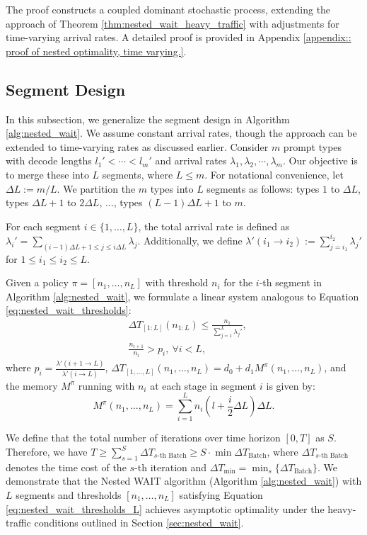 The proof constructs a coupled dominant stochastic process, extending the approach of Theorem \ref{thm:nested_wait_heavy_traffic} with adjustments for time-varying arrival rates. A detailed proof is provided in Appendix \ref{appendix:: proof of nested optimality, time varying.}.

\subsection{Segment Design}

In this subsection, we generalize the segment design in Algorithm \ref{alg:nested_wait}. We assume constant arrival rates, though the approach can be extended to time-varying rates as discussed earlier. Consider $m$ prompt types with decode lengths $l_1' < \cdots < l_m'$ and arrival rates $\lambda_1, \lambda_2, \cdots, \lambda_m$. Our objective is to merge these into $L$ segments, where $L \leq m$. For notational convenience, let $\Delta L:= m/L$. We partition the $m$ types into $L$ segments as follows: types $1$ to $\Delta L$, types $\Delta L+ 1$ to $2\Delta L$, $\dots$, types $(L-1)\Delta L+ 1$ to $m$.

For each segment $i \in \{1, \dots, L\}$, the total arrival rate is defined as $\lambda_i' = \sum_{(i-1)\Delta L+1\le j\le i\Delta L} \lambda_j$. Additionally, we define $\lambda'(i_1 \to i_2) := \sum_{j=i_1}^{i_2} \lambda_j'$ for $1 \leq i_1 \leq i_2 \leq L$.

Given a policy $\pi=[n_1,\dots,n_L]$ with threshold $n_i$ for the $i$-th segment in Algorithm \ref{alg:nested_wait}, we formulate a linear system analogous to Equation \eqref{eq:nested_wait_thresholds}:
\begin{equation}          \label{eq:nested_wait_thresholds_L}
    \begin{aligned}
    &\Delta T_{[1:L]}(n_{1:L}) \leq \frac{n_1}{\sum_{j=1}^L \lambda_j'},  \\
    &\frac{n_{i+1}}{n_i} > p_i, \ \forall i < L,
    \end{aligned}
\end{equation}
where $p_i =\frac{\lambda'(i+1 \to L)}{\lambda'(i \to L)}$, $\Delta T_{[1,\dots,L]}(n_1,\dots,n_L) = d_0 + d_1 M^\pi(n_1, \dots, n_L)$, and the  memory $M^\pi$ running with $n_i$ at each stage in segment $i$ is given by:
\[
M^{\pi}(n_1, \dots, n_L) = \sum_{i=1}^L n_i \left( l + \frac{i}{2} \Delta L\right) \Delta L.
\]

 We define that the total number of iterations over time horizon $[0,T]$ as $ S$. Therefore, we have $T\ge\sum_{s=1}^S \Delta T_{s\text{-th Batch}}\geq S\cdot \min \Delta T_{\text{Batch}}$, where $ \Delta T_{s\text{-th Batch}}$ denotes the time cost of the $s$-th iteration and $\Delta T_{\min}=\min_s\{\Delta T_{\text{Batch}}\}$. We demonstrate that the Nested WAIT algorithm (Algorithm \ref{alg:nested_wait}) with $L$ segments and thresholds $[n_1, \dots, n_L]$ satisfying Equation \eqref{eq:nested_wait_thresholds_L} achieves asymptotic optimality under the heavy-traffic conditions outlined in Section \ref{sec:nested_wait}.

